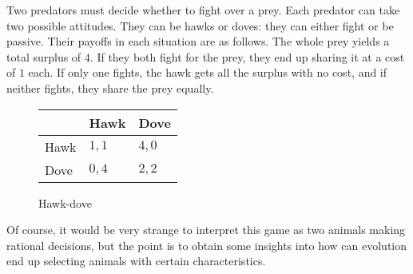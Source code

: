 \documentclass[../../main.tex]{subfiles}
\begin{document}
    \begin{myex}
    \label{HDG}
        Two predators must decide whether to fight over a prey. Each predator can take two possible attitudes. They can be hawks or doves: they can either fight or be passive. Their payoffs in each situation are as follows. The whole prey yields a total surplus of $4$. If they both fight for the prey, they end up sharing it at a cost of $1$ each. If only one fights, the hawk gets all the surplus with no cost, and if neither fights, they share the prey equally.
        \begin{figure}[htb]
        \centering
        \begin{tabular}{l|l|l}
             & Hawk  & Dove  \\ \hline
        Hawk & $1,1$ & $4,0$ \\ \hline
        Dove & $0,4$ & $2,2$
        \end{tabular}
        \caption{Hawk-dove}
        \label{fig:HDG}
        \end{figure}

        Of course, it would be very strange to interpret this game as two animals making rational decisions, but the point is to obtain some insights into how can evolution end up selecting animals with certain characteristics. 
    \end{myex}
    
\end{document}
